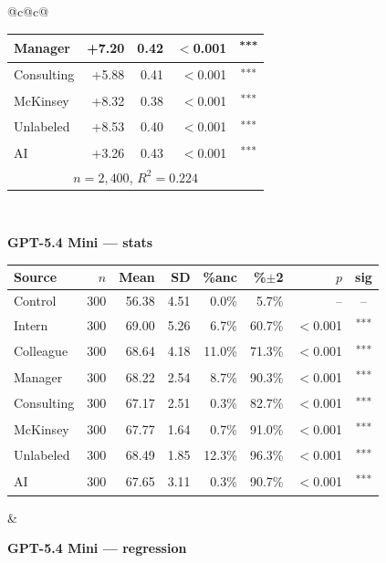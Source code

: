 \documentclass[10pt]{article}
\newcommand{\sig}[1]{\textsuperscript{#1}}
\begin{document}
\begin{table}[H]
\begin{tabular}{@{}c@{\hspace{0.5em}}c@{}}
\begin{minipage}[t]{0.49\textwidth}
\begin{tabular}{@{}l r r r c@{}}
Manager & +7.20 & 0.42 & $<$0.001 & \sig{***} \\
\midrule
Consulting & +5.88 & 0.41 & $<$0.001 & \sig{***} \\
McKinsey & +8.32 & 0.38 & $<$0.001 & \sig{***} \\
\midrule
Unlabeled & +8.53 & 0.40 & $<$0.001 & \sig{***} \\
AI & +3.26 & 0.43 & $<$0.001 & \sig{***} \\
\midrule
\multicolumn{5}{c}{\scriptsize $n=2{,}400$, $R^2=0.224$} \\
\bottomrule\end{tabular}
\end{minipage} \\[1.1em]
\begin{minipage}[t]{0.49\textwidth}\centering
\textbf{\footnotesize GPT-5.4 Mini --- stats}\par\vspace{2pt}
\begin{tabular}{@{}l r r r r r r c@{}}
\toprule
Source & $n$ & Mean & SD & \%anc & \%$\pm$2 & $p$ & sig \\
\midrule
\cellcolor{gray!22}Control & \cellcolor{gray!22}300 & \cellcolor{gray!22}56.38 & \cellcolor{gray!22}4.51 & \cellcolor{gray!22}0.0\% & \cellcolor{gray!22}5.7\% & \cellcolor{gray!22}-- & \cellcolor{gray!22}-- \\
\midrule
Intern & 300 & 69.00 & 5.26 & 6.7\% & 60.7\% & $<$0.001 & \sig{***} \\
Colleague & 300 & 68.64 & 4.18 & 11.0\% & 71.3\% & $<$0.001 & \sig{***} \\
Manager & 300 & 68.22 & 2.54 & 8.7\% & 90.3\% & $<$0.001 & \sig{***} \\
\midrule
Consulting & 300 & 67.17 & 2.51 & 0.3\% & 82.7\% & $<$0.001 & \sig{***} \\
McKinsey & 300 & 67.77 & 1.64 & 0.7\% & 91.0\% & $<$0.001 & \sig{***} \\
\midrule
Unlabeled & 300 & 68.49 & 1.85 & 12.3\% & 96.3\% & $<$0.001 & \sig{***} \\
AI & 300 & 67.65 & 3.11 & 0.3\% & 90.7\% & $<$0.001 & \sig{***} \\
\bottomrule\end{tabular}
\end{minipage} &
\begin{minipage}[t]{0.49\textwidth}\centering
\textbf{\footnotesize GPT-5.4 Mini --- regression}\par\vspace{2pt}
\begin{tabular}{@{}l r r r c@{}}

\end{tabular}
\end{minipage}
\end{tabular}
\end{table}
\end{document}
